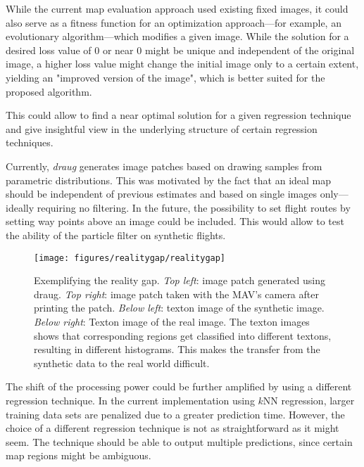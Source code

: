 \documentclass{report}
\begin{document}
While the current map evaluation approach used existing fixed images,
it could also serve as a fitness function for an optimization
approach---for example, an evolutionary algorithm---which modifies a
given image. While the solution for a desired loss value of 0 or near
0 might be unique and independent of the original image, a higher loss
value might change the initial image only to a certain extent,
yielding an "improved version of the image", which is better suited
for the proposed algorithm.

This could allow to find a near optimal solution for a
given regression technique and give insightful view in the underlying
structure of certain regression techniques.

Currently, \emph{draug} generates image patches based on drawing
samples from parametric distributions. This was motivated by the fact
that an ideal map should be independent of previous estimates and
based on single images only---ideally requiring no filtering.  In the
future, the possibility to set flight routes by setting way points
above an image could be included. This would allow to test the ability
of the particle filter on synthetic flights.

\begin{figure}[h!]
\begin{center}
\texttt{[image: figures/realitygap/realitygap]}
\caption{{\label{fig:realitygap}
Exemplifying the reality gap. \emph{Top left}: image patch generated using draug. \emph{Top
      right}: image patch taken with the MAV's camera after printing
    the patch. \emph{Below left}: texton image of the synthetic
    image. \emph{Below right}: Texton image of the real image. The
    texton images shows that corresponding regions get classified into
    different textons, resulting in different histograms. This makes
    the transfer from the synthetic data to the real world difficult.%
}}
\end{center}
\end{figure}

The shift of the processing power could be further amplified by using
a different regression technique. In the current implementation using
$k$NN regression, larger training data sets are penalized due to a
greater prediction time. However, the choice of a different regression
technique is not as straightforward as it might seem. The technique
should be able to output multiple predictions, since certain map
regions might be ambiguous.
\end{document}
